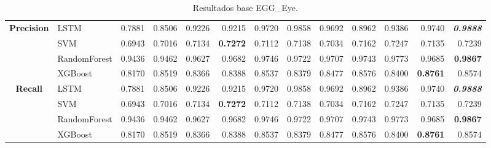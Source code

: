 \begin{table}[H]
\begin{adjustbox}{max width=12cm}
\begin{tabular}{|c|l|r|r|r|r|r|r|r|r|r|r|r|}
			\hline
			\textbf{Precision} & LSTM &  0.7881 &  0.8506 &  0.9226 &  0.9215 &  0.9720 &  0.9858 &  0.9692 &  0.8962 &  0.9386 &  0.9740 &  \textit{\textbf{0.9888}} \\
			& SVM &  0.6943 &  0.7016 &  0.7134 &  \textbf{0.7272} &  0.7112 &  0.7138 &  0.7034 &  0.7162 &  0.7247 &  0.7135 &  0.7239 \\
			& RandomForest &  0.9436 &  0.9462 &  0.9627 &  0.9682 &  0.9746 &  0.9722 &  0.9707 &  0.9743 &  0.9773 &  0.9685 &  \textbf{0.9867} \\
			& XGBoost &  0.8170 &  0.8519 &  0.8366 &  0.8388 &  0.8537 &  0.8379 &  0.8477 &  0.8576 &  0.8400 &  \textbf{0.8761} &  0.8574 \\
			\hline
			\textbf{Recall} &  LSTM &  0.7881 &  0.8506 &  0.9226 &  0.9215 &  0.9720 &  0.9858 &  0.9692 &  0.8962 &  0.9386 &  0.9740 & \textit{ \textbf{  0.9888 } } \\
			&  SVM &  0.6943 &  0.7016 &  0.7134 & \textbf{  0.7272 } &  0.7112 &  0.7138 &  0.7034 &  0.7162 &  0.7247 &  0.7135 &  0.7239 \\
			&  RandomForest &  0.9436 &  0.9462 &  0.9627 &  0.9682 &  0.9746 &  0.9722 &  0.9707 &  0.9743 &  0.9773 &  0.9685 & \textbf{  0.9867 } \\
			&  XGBoost &  0.8170 &  0.8519 &  0.8366 &  0.8388 &  0.8537 &  0.8379 &  0.8477 &  0.8576 &  0.8400 & \textbf{  0.8761 } &  0.8574 \\
			\hline
		\end{tabular}
	\end{adjustbox}
	\caption{Resultados base EGG\_Eye.}
	\label{tab:EGGEyebase}
\end{table}
